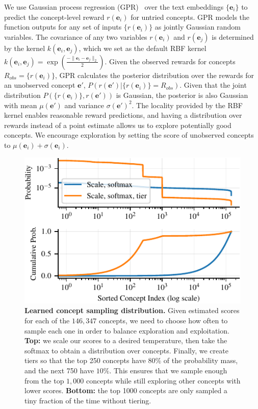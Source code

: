 We use Gaussian process regression (GPR)~\cite{williams1995gaussian} over the text embeddings $\{\mathbf{e}_i\}$ to predict the concept-level reward $r(\mathbf{e}_i)$ for untried concepts. 
GPR models the function outputs for any set of inputs $\{r(\mathbf{e}_i)\}$ as jointly Gaussian random variables. 
The covariance of any two variables $r(\mathbf{e}_i)$ and $r(\mathbf{e}_j)$ is determined by the kernel $k(\mathbf{e}_i, \mathbf{e}_j)$, which we set as the default RBF kernel $k(\mathbf{e}_i, \mathbf{e}_j) = \exp(\frac{-\|\mathbf{e}_i - \mathbf{e}_j\|_2}{2})$. 
Given the observed rewards for concepts $R_{obs} = \{r(\mathbf e_i)\}$, GPR calculates the posterior distribution over the rewards for an unobserved concept $\mathbf e'$, $P(r(\mathbf e') | \{r(\mathbf{e}_i)\} = R_{obs})$. Given that the joint distribution  $P(\{r(\mathbf{e}_i)\}, r(\mathbf{e}'))$ is Gaussian, the posterior is also Gaussian with mean $\mu(\mathbf e')$ and variance $\sigma(\mathbf e')^2$. The locality provided by the RBF kernel enables reasonable reward predictions, and having a distribution over rewards instead of a point estimate allows us to explore potentially good concepts. We encourage exploration by setting the score of unobserved concepts to $\mu(\mathbf{e}_i) + \sigma(\mathbf{e}_i)$.

\begin{figure}[t]
    \centering
    \includegraphics[width=0.7\linewidth]{figures/sampling_dist_shorter.pdf}
    \caption{\textbf{Learned concept sampling distribution.} Given estimated scores for each of the $146,347$ concepts, we need to choose how often to sample each one in order to balance exploration and exploitation.
    \textbf{Top:} we scale our scores to a desired temperature, then take the softmax to obtain a distribution over concepts. Finally, we create tiers so that the top 250 concepts have $80\%$ of the probability mass, and the next 750 have $10\%$. This ensures that we sample enough from the top $1{,}000$ concepts while still exploring other concepts with lower scores.
    \textbf{Bottom:} the top 1000 concepts are only sampled a tiny fraction of the time without tiering.}
    \label{fig:sampling_dist}
    \vspace{-0.12in}
\end{figure}

